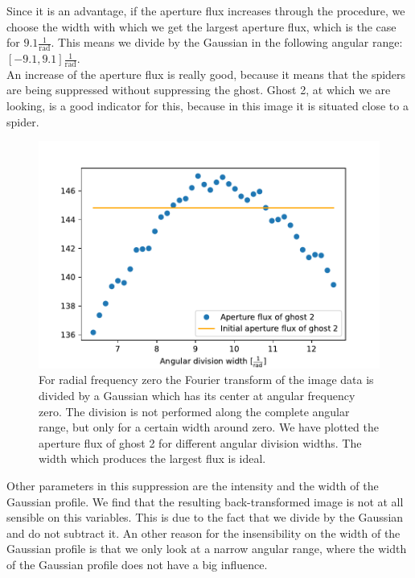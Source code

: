 Since it is an advantage, if the aperture flux increases through the procedure, we choose the width with which we get the largest aperture flux, which is the case for $9.1 \frac{1}{\mathrm{rad}}$. This means we divide by the Gaussian in the following angular range: $[-9.1, 9.1] \frac{1}{\mathrm{rad}}$.\\
An increase of the aperture flux is really good, because it means that the spiders are being suppressed without suppressing the ghost. Ghost 2, at which we are looking, is a good indicator for this, because in this image it is situated close to a spider.
\begin{figure}[H]
	\centering
		\includegraphics[width=1.0\textwidth]{pics/rad0_diffsubwidths.pdf}
		\caption{For radial frequency zero the Fourier transform of the image data is divided by a Gaussian which has its center at angular frequency zero. The division is not performed along the complete angular range, but only for a certain width around zero. We have plotted the aperture flux of ghost 2 for different angular division widths. The width which produces the largest flux is ideal.}
		\label{fig:rad0_diffsubwidths}
\end{figure}
Other parameters in this suppression are the intensity and the width of the Gaussian profile. We find that the resulting back-transformed image is not at all sensible on this variables. This is due to the fact that we divide by the Gaussian and do not subtract it. An other reason for the insensibility on the width of the Gaussian profile is that we only look at a narrow angular range, where the width of the Gaussian profile does not have a big influence. \\
